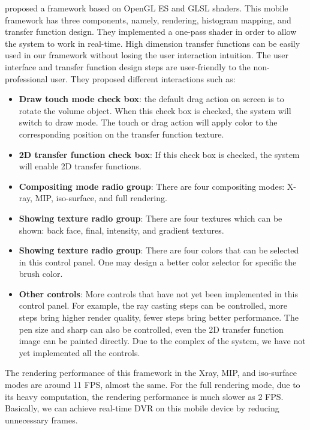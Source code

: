 \cite{7852799} proposed a framework based on OpenGL ES and GLSL shaders. This
mobile framework has three components, namely, rendering,
histogram mapping, and transfer function design. They
implemented a one-pass shader in order to allow the system to work in real-time. High dimension transfer functions can
be easily used in our framework without losing the user
interaction intuition. The user interface and transfer function
design steps are user-friendly to the non-professional user. They proposed different interactions such as:
\begin{itemize}
\item \textbf{Draw touch mode check box}: the default drag action
on screen is to rotate the volume object. When this
check box is checked, the system will switch to draw
mode. The touch or drag action will apply color to the
corresponding position on the transfer function texture.
\item \textbf{2D transfer function check box}: If this check box is
checked, the system will enable 2D transfer functions.
\item \textbf{Compositing mode radio group}: There are four
compositing modes: X-ray, MIP, iso-surface, and full
rendering.
\item \textbf{Showing texture radio group}: There are four textures
which can be shown: back face, final, intensity, and
gradient textures.
\item \textbf{Showing texture radio group}: There are four colors that can
be selected in this control panel. One may design a
better color selector for specific the brush color.
\item \textbf{Other controls}: More controls that have not yet been
implemented in this control panel. For example, the ray
casting steps can be controlled, more steps bring higher
render quality, fewer steps bring better performance. The
pen size and sharp can also be controlled, even the 2D
transfer function image can be painted directly. Due to the
complex of the system, we have not yet implemented all
the controls.
\end{itemize}
The rendering performance of this framework in the Xray,
MIP, and iso-surface modes are around 11 FPS, almost
the same. For the full rendering mode, due to its heavy
computation, the rendering performance is much slower as 2
FPS. Basically, we can achieve real-time DVR on this mobile
device by reducing unnecessary frames.



